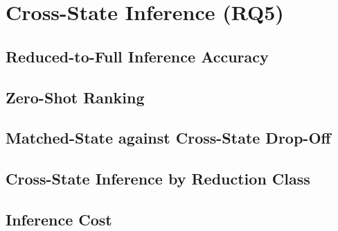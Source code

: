 \section{Cross-State Inference (RQ5)}
\label{sec:results:rq5}

\subsection{Reduced-to-Full Inference Accuracy}
\label{sec:results:rq5:accuracy}

\subsection{Zero-Shot Ranking}
\label{sec:results:rq5:ranking}

\subsection{Matched-State against Cross-State Drop-Off}
\label{sec:results:rq5:dropoff}

\subsection{Cross-State Inference by Reduction Class}
\label{sec:results:rq5:byfamily}

\subsection{Inference Cost}
\label{sec:results:rq5:cost}
